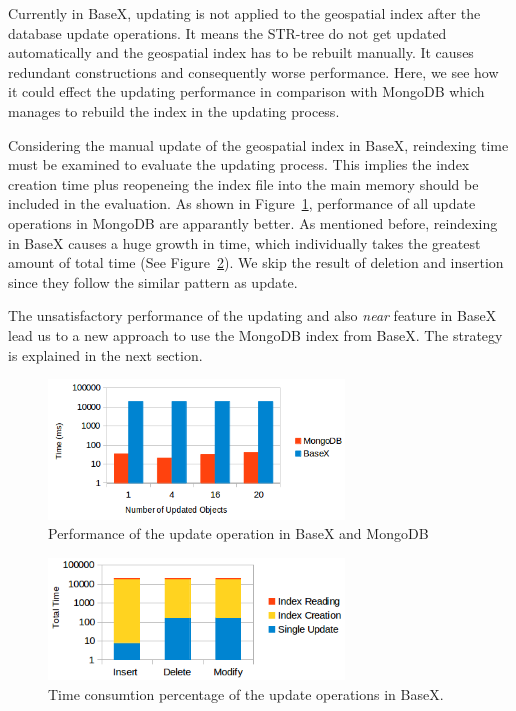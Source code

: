 \documentclass[a4paper,12pt]{article}
\begin{document}
Currently in BaseX, updating is not applied to the geospatial index after the database update operations. It means the STR-tree do not get updated automatically and the geospatial index has to be rebuilt manually. It causes redundant constructions and consequently worse performance. Here, we see how it could effect the updating performance in comparison with MongoDB which manages to rebuild the index in the updating process.

Considering the manual update of the geospatial index in BaseX, reindexing time must be examined to evaluate the updating process. This implies the index creation time plus reopeneing the index file into the main memory should be included in the evaluation. 
As shown in Figure~\ref{figBXvsMongoUpdate}, performance of all update operations in MongoDB are apparantly better. As mentioned before, reindexing in BaseX causes a huge growth in time, which individually takes the greatest amount of total time (See Figure~\ref{figBXUpdate}). We skip the result of deletion and insertion since they follow the similar pattern as update.

The unsatisfactory performance of the updating and also \textit{near} feature in BaseX lead us to a new approach to use the MongoDB index from BaseX. The strategy is explained in the next section.

 


\begin{figure}
\centering
\includegraphics[width=0.7\textwidth]{BXvsMongo-Update.png}
\caption{Performance of the update operation in BaseX and MongoDB}
\label{figBXvsMongoUpdate}
\end{figure}


\begin{figure}
\centering
\includegraphics[width=0.7\textwidth]{BXUpdate.png}
\caption{Time consumtion percentage of the update operations in BaseX.}
\label{figBXUpdate}
\end{figure}
\end{document}
